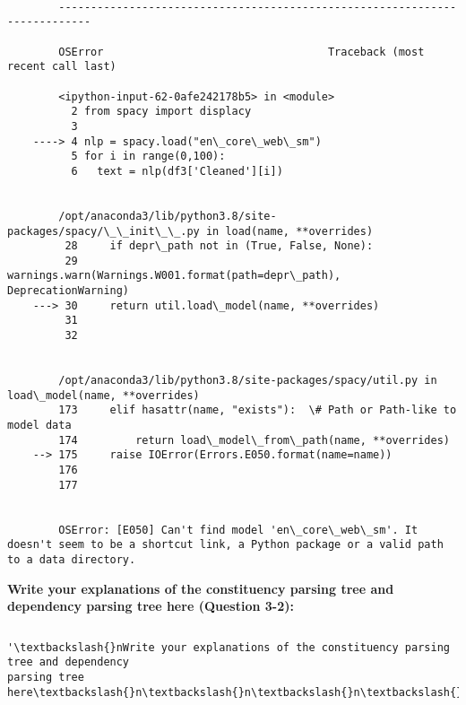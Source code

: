 \documentclass[11pt]{article}
\makeatletter
\newcommand{\boxspacing}{\kern\kvtcb@left@rule\kern\kvtcb@boxsep}
\newcommand{\prompt}[4]{
        \ttfamily\llap{{\color{#2}[#3]:\hspace{3pt}#4}}\vspace{-\baselineskip}
    }
\makeatother
\begin{document}
    \begin{Verbatim}[commandchars=\\\{\}]

        ---------------------------------------------------------------------------

        OSError                                   Traceback (most recent call last)

        <ipython-input-62-0afe242178b5> in <module>
          2 from spacy import displacy
          3 
    ----> 4 nlp = spacy.load("en\_core\_web\_sm")
          5 for i in range(0,100):
          6   text = nlp(df3['Cleaned'][i])


        /opt/anaconda3/lib/python3.8/site-packages/spacy/\_\_init\_\_.py in load(name, **overrides)
         28     if depr\_path not in (True, False, None):
         29         warnings.warn(Warnings.W001.format(path=depr\_path), DeprecationWarning)
    ---> 30     return util.load\_model(name, **overrides)
         31 
         32 


        /opt/anaconda3/lib/python3.8/site-packages/spacy/util.py in load\_model(name, **overrides)
        173     elif hasattr(name, "exists"):  \# Path or Path-like to model data
        174         return load\_model\_from\_path(name, **overrides)
    --> 175     raise IOError(Errors.E050.format(name=name))
        176 
        177 


        OSError: [E050] Can't find model 'en\_core\_web\_sm'. It doesn't seem to be a shortcut link, a Python package or a valid path to a data directory.

    \end{Verbatim}

    \textbf{Write your explanations of the constituency parsing tree and
dependency parsing tree here (Question 3-2):}

    \begin{tcolorbox}[breakable, size=fbox, boxrule=1pt, pad at break*=1mm,colback=cellbackground, colframe=cellborder]
\prompt{In}{incolor}{1}{\boxspacing}
\begin{Verbatim}[commandchars=\\\{\}]

\end{Verbatim}
\end{tcolorbox}

            \begin{tcolorbox}[breakable, size=fbox, boxrule=.5pt, pad at break*=1mm, opacityfill=0]
\prompt{Out}{outcolor}{1}{\boxspacing}
\begin{Verbatim}[commandchars=\\\{\}]
'\textbackslash{}nWrite your explanations of the constituency parsing tree and dependency
parsing tree here\textbackslash{}n\textbackslash{}n\textbackslash{}n\textbackslash{}n'
\end{Verbatim}
\end{tcolorbox}
        

    
    
    
\end{document}
